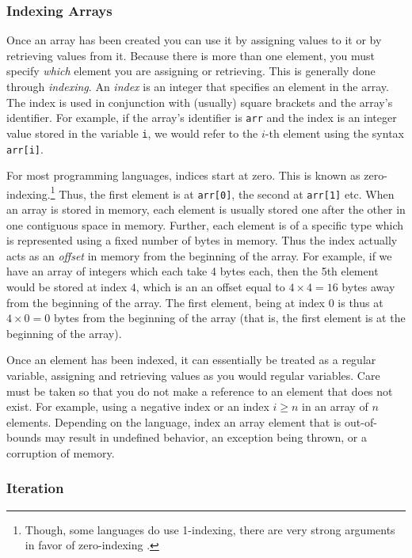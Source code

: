 \subsubsection{Indexing Arrays}

Once an array has been created you can use it by assigning values
to it or by retrieving values from it.  Because there is more than one
element, you must specify \emph{which} element you are assigning
or retrieving.  This is generally done through \emph{indexing}.  An 
\emph{index} is an integer that specifies an element in the array.
The index is used in conjunction with (usually) square brackets and
the array's identifier.  For example, if the array's identifier is 
\texttt{arr} and the index is an integer value stored in the 
variable \texttt{i}, we would refer to the $i$-th element using
the syntax \texttt{arr[i]}.

For most programming languages, indices start at zero.  This is 
known as zero-indexing.\footnote{Though, some languages do 
use 1-indexing, there are very strong arguments in favor of 
zero-indexing \cite{Dijkstra82}.} Thus, the first element is at 
\texttt{arr[0]}, the second at \texttt{arr[1]}
etc.  When an array is stored in memory, each element is usually 
stored one after the other in one contiguous space in memory.  
Further, each element is of a specific type which is represented
using a fixed number of bytes in memory.  Thus the index actually
acts as an \emph{offset} in memory from the beginning of the
array.  For example, if we have an array of integers which each take
4 bytes each, then the 5th element would be stored at index $4$, 
which is an an offset equal to $4 \times 4 = 16$ bytes away from the 
beginning of the array.  The first element, being at index $0$ is thus
at $4 \times 0 = 0$ bytes from the beginning of the array (that is, 
the first element is at the beginning of the array).

Once an element has been indexed, it can essentially be treated as
a regular variable, assigning and retrieving values as you would regular
variables.  Care must be taken so that you do not make a reference
to an element that does not exist.  For example, using a negative
index or an index $i \geq n$ in an array of $n$ elements.  Depending
on the language, index an array element that is out-of-bounds may
result in undefined behavior, an exception being thrown, or a
corruption of memory.

\subsubsection{Iteration}

